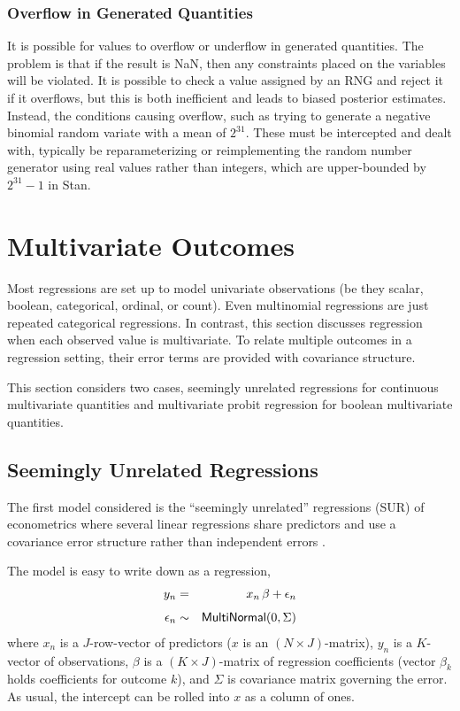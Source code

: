 \subsubsection{Overflow in Generated Quantities}

It is possible for values to overflow or underflow in generated
quantities.  The problem is that if the result is NaN, then any
constraints placed on the variables will be violated.  It is possible
to check a value assigned by an RNG and reject it if it overflows, but
this is both inefficient and leads to biased posterior estimates.
Instead, the conditions causing overflow, such as trying to generate a
negative binomial random variate with a mean of $2^{31}$.  These must
be intercepted and dealt with, typically be reparameterizing or
reimplementing the random number generator using real values rather
than integers, which are upper-bounded by $2^{31} - 1$ in Stan.
  

\section{Multivariate Outcomes}

Most regressions are set up to model univariate observations (be they
scalar, boolean, categorical, ordinal, or count).  Even multinomial
regressions are just repeated categorical regressions.  In contrast,
this section discusses regression when each observed value is
multivariate.  To relate multiple outcomes in a regression setting,
their error terms are provided with covariance structure.  

This section considers two cases, seemingly unrelated regressions for
continuous multivariate quantities and multivariate probit regression
for boolean multivariate quantities.

\subsection{Seemingly Unrelated Regressions} 

The first model considered is the ``seemingly unrelated'' regressions
(SUR) of econometrics where several linear regressions share
predictors and use a covariance error structure rather than
independent errors \citep{Zellner:1962,Greene:2011}.

The model is easy to write down as a regression,
%
\begin{eqnarray*}
 y_n & = & x_n \, \beta + \epsilon_n
\\[4pt]
 \epsilon_n & \sim & \distro{MultiNormal}(0, \Sigma)
\end{eqnarray*}
%
where $x_n$ is a $J$-row-vector of predictors ($x$ is an $(N \times
J)$-matrix), $y_n$ is a $K$-vector of observations, $\beta$ is a $(K
\times J)$-matrix of regression coefficients (vector $\beta_k$ holds
coefficients for outcome $k$), and $\Sigma$ is covariance matrix
governing the error.  As usual, the intercept can be rolled into $x$
as a column of ones.

